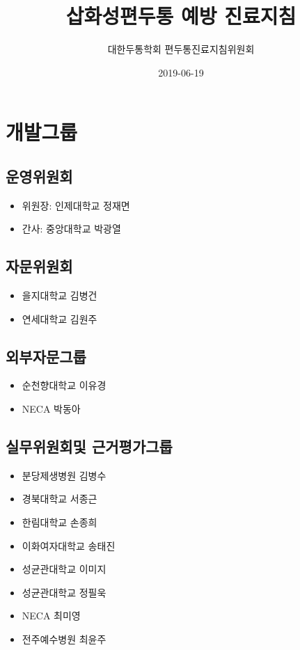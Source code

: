 \documentclass[]{book}
\title{삽화성편두통 예방 진료지침}
\author{대한두통학회 편두통진료지침위원회}
\date{2019-06-19}
\providecommand{\tightlist}{%
  \setlength{\itemsep}{0pt}\setlength{\parskip}{0pt}}
\begin{document}
\maketitle

{
\setcounter{tocdepth}{1}
\tableofcontents
}
\hypertarget{section}{%
\chapter{개발그룹}\label{section}}

\hypertarget{section-1}{%
\section{운영위원회}\label{section-1}}

\begin{itemize}
\tightlist
\item
  위원장: 인제대학교 정재면
\item
  간사: 중앙대학교 박광열
\end{itemize}

\hypertarget{section-2}{%
\section{자문위원회}\label{section-2}}

\begin{itemize}
\tightlist
\item
  을지대학교 김병건
\item
  연세대학교 김원주
\end{itemize}

\hypertarget{section-3}{%
\section{외부자문그룹}\label{section-3}}

\begin{itemize}
\tightlist
\item
  순천향대학교 이유경
\item
  NECA 박동아
\end{itemize}

\hypertarget{section-4}{%
\section{실무위원회및 근거평가그룹}\label{section-4}}

\begin{itemize}
\tightlist
\item
  분당제생병원 김병수
\item
  경북대학교 서종근
\item
  한림대학교 손종희
\item
  이화여자대학교 송태진
\item
  성균관대학교 이미지
\item
  성균관대학교 정필욱
\item
  NECA 최미영
\item
  전주예수병원 최윤주
\end{itemize}
\end{document}
